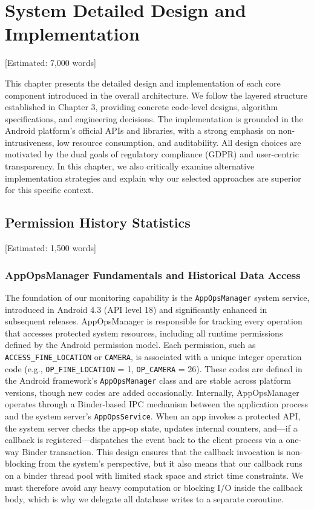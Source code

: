 \newpage\section{System Detailed Design and Implementation} [Estimated: 7,000 words]

This chapter presents the detailed design and implementation of each core component introduced in the overall architecture. We follow the layered structure established in Chapter 3, providing concrete code-level designs, algorithm specifications, and engineering decisions. The implementation is grounded in the Android platform's official APIs and libraries, with a strong emphasis on non-intrusiveness, low resource consumption, and auditability. All design choices are motivated by the dual goals of regulatory compliance (GDPR) and user-centric transparency. In this chapter, we also critically examine alternative implementation strategies and explain why our selected approaches are superior for this specific context.

\subsection{Permission History Statistics} [Estimated: 1,500 words]

\subsubsection{AppOpsManager Fundamentals and Historical Data Access}

The foundation of our monitoring capability is the \texttt{AppOpsManager} system service, introduced in Android 4.3 (API level 18) and significantly enhanced in subsequent releases. AppOpsManager is responsible for tracking every operation that accesses protected system resources, including all runtime permissions defined by the Android permission model. Each permission, such as \texttt{ACCESS\_FINE\_LOCATION} or \texttt{CAMERA}, is associated with a unique integer operation code (e.g., \texttt{OP\_FINE\_LOCATION} = 1, \texttt{OP\_CAMERA} = 26). These codes are defined in the Android framework's \texttt{AppOpsManager} class and are stable across platform versions, though new codes are added occasionally. Internally, AppOpsManager operates through a Binder-based IPC mechanism between the application process and the system server's \texttt{AppOpsService}. When an app invokes a protected API, the system server checks the app-op state, updates internal counters, and—if a callback is registered—dispatches the event back to the client process via a one-way Binder transaction. This design ensures that the callback invocation is non-blocking from the system's perspective, but it also means that our callback runs on a binder thread pool with limited stack space and strict time constraints. We must therefore avoid any heavy computation or blocking I/O inside the callback body, which is why we delegate all database writes to a separate coroutine.

